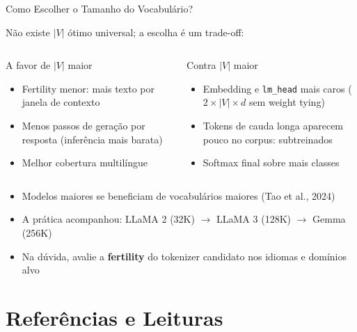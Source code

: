 \documentclass[aspectratio=169,xcolor=dvipsnames]{beamer}
\begin{document}
\begin{frame}{Como Escolher o Tamanho do Vocabulário?}

Não existe $|V|$ ótimo universal; a escolha é um trade-off:

\vspace{4pt}

\begin{columns}[T]
\begin{exampleblock}{A favor de $|V|$ maior}
\begin{itemize}
    \item Fertility menor: mais texto por janela de contexto
    \item Menos passos de geração por resposta (inferência mais barata)
    \item Melhor cobertura multilíngue
\end{itemize}
\end{exampleblock}

\begin{alertblock}{Contra $|V|$ maior}
\begin{itemize}
    \item Embedding e \texttt{lm\_head} mais caros ($2 \times |V| \times d$ sem weight tying)
    \item Tokens de cauda longa aparecem pouco no corpus: subtreinados
    \item Softmax final sobre mais classes
\end{itemize}
\end{alertblock}
\end{columns}

\vspace{6pt}

\begin{itemize}
    \item Modelos maiores se beneficiam de vocabulários maiores (Tao et al., 2024)
    \item A prática acompanhou: LLaMA 2 (32K) $\rightarrow$ LLaMA 3 (128K) $\rightarrow$ Gemma (256K)
    \item Na dúvida, avalie a \textbf{fertility} do tokenizer candidato nos idiomas e domínios alvo
\end{itemize}

\end{frame}

\section*{Referências e Leituras}
\end{document}
